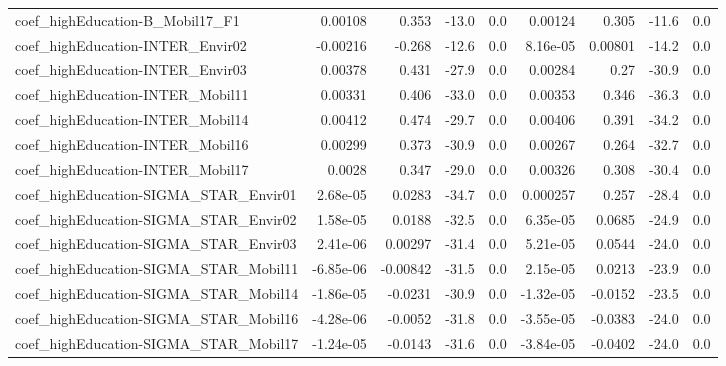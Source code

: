 \begin{tabular}{lrrrrrrrr}
coef\_highEducation-B\_Mobil17\_F1           &     0.00108 &        0.353 &   -13.0 &      0.0 &    0.00124 &       0.305 &        -11.6 &           0.0 \\
coef\_highEducation-INTER\_Envir02          &    -0.00216 &       -0.268 &   -12.6 &      0.0 &   8.16e-05 &     0.00801 &        -14.2 &           0.0 \\
coef\_highEducation-INTER\_Envir03          &     0.00378 &        0.431 &   -27.9 &      0.0 &    0.00284 &        0.27 &        -30.9 &           0.0 \\
coef\_highEducation-INTER\_Mobil11          &     0.00331 &        0.406 &   -33.0 &      0.0 &    0.00353 &       0.346 &        -36.3 &           0.0 \\
coef\_highEducation-INTER\_Mobil14          &     0.00412 &        0.474 &   -29.7 &      0.0 &    0.00406 &       0.391 &        -34.2 &           0.0 \\
coef\_highEducation-INTER\_Mobil16          &     0.00299 &        0.373 &   -30.9 &      0.0 &    0.00267 &       0.264 &        -32.7 &           0.0 \\
coef\_highEducation-INTER\_Mobil17          &      0.0028 &        0.347 &   -29.0 &      0.0 &    0.00326 &       0.308 &        -30.4 &           0.0 \\
coef\_highEducation-SIGMA\_STAR\_Envir01     &    2.68e-05 &       0.0283 &   -34.7 &      0.0 &   0.000257 &       0.257 &        -28.4 &           0.0 \\
coef\_highEducation-SIGMA\_STAR\_Envir02     &    1.58e-05 &       0.0188 &   -32.5 &      0.0 &   6.35e-05 &      0.0685 &        -24.9 &           0.0 \\
coef\_highEducation-SIGMA\_STAR\_Envir03     &    2.41e-06 &      0.00297 &   -31.4 &      0.0 &   5.21e-05 &      0.0544 &        -24.0 &           0.0 \\
coef\_highEducation-SIGMA\_STAR\_Mobil11     &   -6.85e-06 &     -0.00842 &   -31.5 &      0.0 &   2.15e-05 &      0.0213 &        -23.9 &           0.0 \\
coef\_highEducation-SIGMA\_STAR\_Mobil14     &   -1.86e-05 &      -0.0231 &   -30.9 &      0.0 &  -1.32e-05 &     -0.0152 &        -23.5 &           0.0 \\
coef\_highEducation-SIGMA\_STAR\_Mobil16     &   -4.28e-06 &      -0.0052 &   -31.8 &      0.0 &  -3.55e-05 &     -0.0383 &        -24.0 &           0.0 \\
coef\_highEducation-SIGMA\_STAR\_Mobil17     &   -1.24e-05 &      -0.0143 &   -31.6 &      0.0 &  -3.84e-05 &     -0.0402 &        -24.0 &           0.0 \\

\end{tabular}
